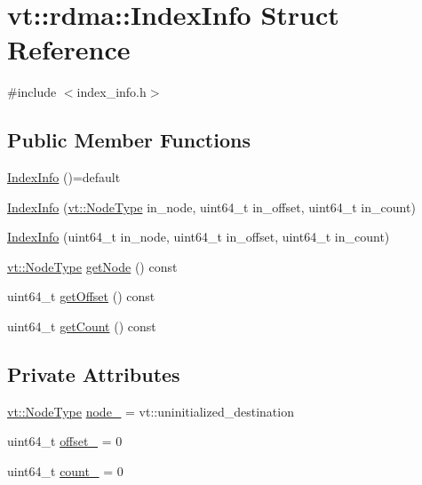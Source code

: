 \hypertarget{structvt_1_1rdma_1_1_index_info}{}\section{vt\+:\+:rdma\+:\+:Index\+Info Struct Reference}
\label{structvt_1_1rdma_1_1_index_info}


{\ttfamily \#include $<$index\+\_\+info.\+h$>$}

\subsection*{Public Member Functions}
\begin{DoxyCompactItemize}
\item 
\hyperlink{structvt_1_1rdma_1_1_index_info_af6a666e4d7d971e0760fc4b0d2fee7df}{Index\+Info} ()=default
\item 
\hyperlink{structvt_1_1rdma_1_1_index_info_a3e2a60b3dbc28c2c67e6bbf6d5cdaba1}{Index\+Info} (\hyperlink{namespacevt_a866da9d0efc19c0a1ce79e9e492f47e2}{vt\+::\+Node\+Type} in\+\_\+node, uint64\+\_\+t in\+\_\+offset, uint64\+\_\+t in\+\_\+count)
\item 
\hyperlink{structvt_1_1rdma_1_1_index_info_a5722f4ee5d85747af1068b09506c8ff8}{Index\+Info} (uint64\+\_\+t in\+\_\+node, uint64\+\_\+t in\+\_\+offset, uint64\+\_\+t in\+\_\+count)
\item 
\hyperlink{namespacevt_a866da9d0efc19c0a1ce79e9e492f47e2}{vt\+::\+Node\+Type} \hyperlink{structvt_1_1rdma_1_1_index_info_a94944747d01e14bb229837b048067c4f}{get\+Node} () const
\item 
uint64\+\_\+t \hyperlink{structvt_1_1rdma_1_1_index_info_ad69b51477f01c99fe3b636ba49477138}{get\+Offset} () const
\item 
uint64\+\_\+t \hyperlink{structvt_1_1rdma_1_1_index_info_ae93f18d7a207ba517af6f7cd06a938bb}{get\+Count} () const
\end{DoxyCompactItemize}
\subsection*{Private Attributes}
\begin{DoxyCompactItemize}
\item 
\hyperlink{namespacevt_a866da9d0efc19c0a1ce79e9e492f47e2}{vt\+::\+Node\+Type} \hyperlink{structvt_1_1rdma_1_1_index_info_adb1cbc5a0271e9484b9ef03da25bd6c3}{node\+\_\+} = vt\+::uninitialized\+\_\+destination
\item 
uint64\+\_\+t \hyperlink{structvt_1_1rdma_1_1_index_info_ac60334cf8ad727810eeaa7163582aded}{offset\+\_\+} = 0
\item 
uint64\+\_\+t \hyperlink{structvt_1_1rdma_1_1_index_info_aca150374e8415d497aeb789ecae05aec}{count\+\_\+} = 0
\end{DoxyCompactItemize}


